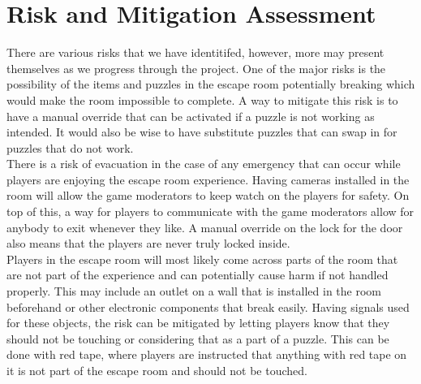 \documentclass[conference]{IEEEtran}
\begin{document}
\section{Risk and Mitigation Assessment}
There are various risks that we have identitifed, however, more may present
themselves as we progress through the project. One of the major risks is
the possibility of the items and puzzles in the escape room potentially
breaking which would make the room impossible to complete. A way
to mitigate this risk is to have a manual override that can be activated
if a puzzle is not working as intended. It would also be wise to have
substitute puzzles that can swap in for puzzles that do not work.
\\
\indent There is a risk of evacuation in the case of any emergency that can occur
while players are enjoying the escape room experience. Having cameras
installed in the room will allow the game moderators to keep watch on
the players for safety. On top of this, a way for players to communicate
with the game moderators allow for anybody to exit whenever they like.
A manual override on the lock for the door also means that the
players are never truly locked inside.
\\
\indent Players in the escape room will most likely come across parts of the room
that are not part of the experience and can potentially cause harm if not
handled properly. This may include an outlet on a wall that is installed
in the room beforehand or other electronic components that break easily.
Having signals used for these objects, the risk can be mitigated by letting
players know that they should not be touching or considering that as a
part of a puzzle. This can be done with red tape, where players are instructed
that anything with red tape on it is not part of the escape room and should
not be touched.
\end{document}
